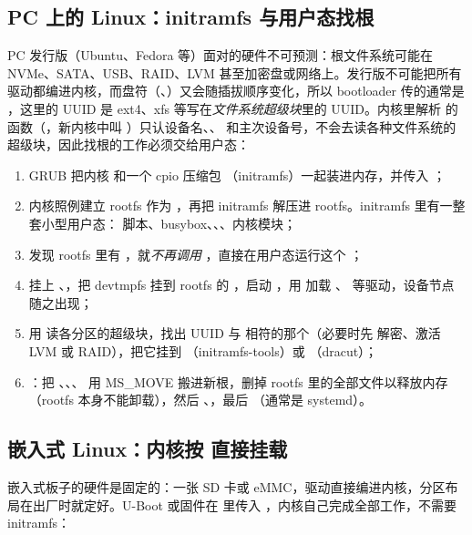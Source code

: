 \subsection{PC 上的 Linux：initramfs 与用户态找根}

PC 发行版（Ubuntu、Fedora 等）面对的硬件不可预测：根文件系统可能在 NVMe、SATA、USB、RAID、LVM 甚至加密盘或网络上。发行版不可能把所有驱动都编进内核，而盘符（、）又会随插拔顺序变化，所以 bootloader 传的通常是 ，这里的 UUID 是 ext4、xfs 等写在\emph{文件系统超级块}里的 UUID。内核里解析  的函数（，新内核中叫 ）只认设备名、、 和主次设备号，不会去读各种文件系统的超级块，因此找根的工作必须交给用户态：

\begin{enumerate}
  \item GRUB 把内核  和一个 cpio 压缩包 （initramfs）一起装进内存，并传入 ；
  \item 内核照例建立 rootfs 作为 \code{/}，再把 initramfs 解压进 rootfs。initramfs 里有一整套小型用户态： 脚本、busybox、、、内核模块；
  \item {} 发现 rootfs 里有 ，就\emph{不再调用} ，直接在用户态运行这个 ；
  \item {} 挂上 、，把 devtmpfs 挂到 rootfs 的 ，启动 ，用  加载 、 等驱动，设备节点随之出现；
  \item 用  读各分区的超级块，找出 UUID 与  相符的那个（必要时先  解密、激活 LVM 或 RAID），把它挂到 （initramfs-tools）或 （dracut）；
  \item {}：把 、、、 用 MS\_MOVE 搬进新根，删掉 rootfs 里的全部文件以释放内存（rootfs 本身不能卸载），然后 、，最后 （通常是 systemd）。
\end{enumerate}

\subsection{嵌入式 Linux：内核按  直接挂载}

嵌入式板子的硬件是固定的：一张 SD 卡或 eMMC，驱动直接编进内核，分区布局在出厂时就定好。U-Boot 或固件在  里传入 ，内核自己完成全部工作，不需要 initramfs：

